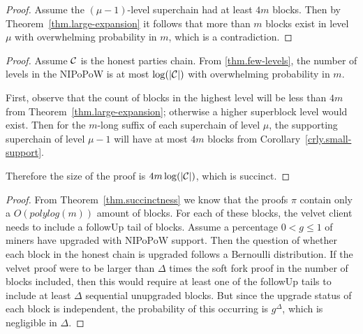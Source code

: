 \restateThmSmallSupport*

\begin{proof}
    Assume the $(\mu - 1)$-level superchain had at least $4m$ blocks. Then by
    Theorem~\ref{thm.large-expansion} it follows that more than $m$ blocks
    exist in level $\mu$ with overwhelming probability in $m$, which is a
    contradiction.
\end{proof}

\restateThmSuccinctness*

\begin{proof}
    Assume $\mathcal{C}$ is the honest parties chain. From \ref{thm.few-levels}, the
    number of levels in the NIPoPoW is at most $\log(|\mathcal{C}|)$ with
    overwhelming probability in $m$.

    First, observe that the count of blocks in the highest level will be less
    than $4m$ from Theorem~\ref{thm.large-expansion}; otherwise a higher
    superblock level would exist. Then for the $m$-long suffix of each
    superchain of level $\mu$, the supporting superchain of level $\mu - 1$
    will have at most $4m$ blocks from Corollary~\ref{crly.small-support}.

    Therefore the size of the proof is $4m \log(|\mathcal{C}|)$, which is succinct.
\end{proof}

\restateThmVelvetSuccinctness*

\begin{proof}
    From Theorem~\ref{thm.succinctness} we know that the proofs $\pi$ contain
    only a $O(polylog(m))$ amount of blocks. For each of these blocks, the
    velvet client needs to include a followUp tail of blocks. Assume a
    percentage $0 < g \leq 1$ of miners have upgraded with NIPoPoW support.
    Then the question of whether each block in the honest chain is upgraded
    follows a Bernoulli distribution. If the velvet proof were to be larger
    than $\Delta$ times the soft fork proof in the number of blocks included,
    then this would require at least one of the followUp tails to include at
    least $\Delta$ sequential unupgraded blocks. But since the upgrade status
    of each block is independent, the probability of this occurring is
    $g^\Delta$, which is negligible in $\Delta$.
\end{proof}
